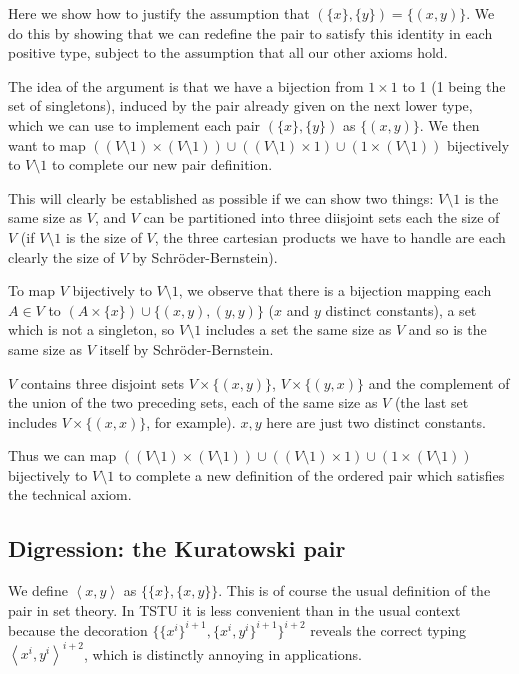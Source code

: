 \documentclass[12pt]{article}
\begin{document}
Here we show how to justify the assumption that $(\{x\},\{y\}) = \{(x,y)\}$.  We do this by showing that we can redefine the pair to satisfy this identity in each positive type, subject to the assumption
that all our other axioms hold.

The idea of the argument is that we have a bijection from $1 \times 1$ to 1 (1 being the set of singletons), induced by the pair already given on the next lower type, which we can use to implement each pair $(\{x\},\{y\})$ as $\{(x,y)\}$.
We then want to map $((V \setminus 1) \times (V \setminus 1)) \cup ((V \setminus 1) \times 1) \cup (1 \times (V \setminus 1))$ bijectively to $V \setminus 1$ to complete our new pair definition.

This will clearly be established as possible if we can show two things:  $V \setminus 1$ is the same size as $V$, and $V$ can be partitioned into three diisjoint sets each the size of $V$ (if $V \setminus 1$ is
the size of $V$, the three cartesian products we have to handle are each clearly the size of $V$ by Schr\"oder-Bernstein).

To map $V$ bijectively to $V \setminus 1$, we observe that there is a bijection mapping each $A \in V$ to $(A \times \{x\}) \cup \{(x,y),(y,y)\} $ ($x$ and $y$ distinct constants), a set which is not a singleton, so $V \setminus 1$ includes
a set the same size as $V$ and so is the same size as $V$ itself by Schr\"oder-Bernstein.

$V$ contains three disjoint sets $V \times \{(x,y)\}$, $V \times \{(y,x)\}$ and the complement of the union of the two preceding sets, each of the same size as $V$ (the last set includes
$V \times \{(x,x)\}$, for example).  $x,y$ here are just two distinct constants.

Thus we can map $((V \setminus 1) \times (V \setminus 1)) \cup ((V \setminus 1) \times 1) \cup (1 \times (V \setminus 1))$ bijectively to $V \setminus 1$ to complete a new definition of the ordered pair
which satisfies the technical axiom.

\subsection{Digression:  the Kuratowski pair}

We define $\left<x,y\right>$ as $\{\{x\},\{x,y\}\}$.  This is of course the usual definition of the pair in set theory.  In TSTU it is less convenient than in the usual context because the decoration $\{\{x^i\}^{i+1},\{x^i,y^i\}^{i+1}\}^{i+2}$ reveals the correct typing $\left<x^i,y^i\right>^{i+2}$, which is distinctly annoying in applications.
\end{document}
